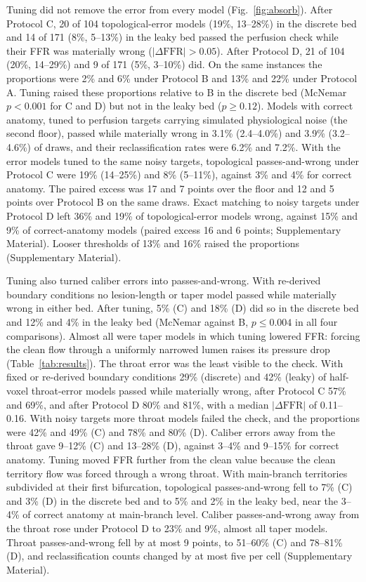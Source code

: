 \documentclass[journal,twoside,web]{ieeecolor}
\begin{document}
Tuning did not remove the error from every model (Fig.~\ref{fig:absorb}). After Protocol C, 20 of 104 topological-error models (19\%, 13--28\%) in the discrete bed and 14 of 171 (8\%, 5--13\%) in the leaky bed passed the perfusion check while their FFR was materially wrong ($|\Delta\mathrm{FFR}| > 0.05$). After Protocol D, 21 of 104 (20\%, 14--29\%) and 9 of 171 (5\%, 3--10\%) did. On the same instances the proportions were 2\% and 6\% under Protocol B and
13\% and 22\% under Protocol A. Tuning raised these proportions relative to B in the discrete bed (McNemar $p < 0.001$ for C and D)
but not in the leaky bed ($p \geq 0.12$). Models with
correct anatomy, tuned to perfusion targets carrying simulated physiological noise (the second floor), passed while materially wrong in 3.1\% (2.4--4.0\%) and 3.9\% (3.2--4.6\%) of draws, and their reclassification rates were 6.2\% and 7.2\%. With the error models tuned to the same noisy targets, topological passes-and-wrong under Protocol C were 19\% (14--25\%) and 8\% (5--11\%), against 3\% and 4\% for correct anatomy. The paired excess was 17 and 7 points over the floor and 12 and 5 points over Protocol B on the same draws. Exact matching to noisy targets under Protocol D left 36\% and 19\% of topological-error models wrong, against 15\% and 9\% of correct-anatomy models (paired excess 16 and 6 points; Supplementary Material).
Looser thresholds of 13\% and 16\% raised the proportions (Supplementary Material).

Tuning also turned caliber errors into passes-and-wrong. With re-derived boundary conditions no lesion-length or taper model
passed while materially wrong in either bed. After tuning, 5\% (C) and 18\% (D) did so in the discrete bed and 12\%
and 4\% in the leaky bed (McNemar against B, $p \leq 0.004$ in all four comparisons). Almost all were taper models
in which tuning lowered FFR: forcing the clean flow through a uniformly narrowed lumen raises its pressure drop
(Table~\ref{tab:results}). The throat error was the least visible to the check. With fixed or re-derived boundary conditions 29\% (discrete) and 42\% (leaky) of half-voxel throat-error models passed while materially wrong, after Protocol C 57\% and 69\%, and after Protocol D 80\% and 81\%, with a median $|\Delta\mathrm{FFR}|$ of 0.11--0.16. With noisy targets more throat models failed the check, and the proportions were 42\% and 49\% (C) and 78\% and 80\% (D). Caliber errors away from the throat gave 9--12\% (C) and 13--28\% (D), against 3--4\% and 9--15\% for correct anatomy. Tuning moved FFR further from the clean value because the clean territory flow was forced through a wrong throat.
With main-branch territories subdivided at their first bifurcation, topological passes-and-wrong fell to 7\% (C) and 3\% (D) in the discrete bed and to 5\% and 2\% in the leaky bed, near the 3--4\% of correct anatomy at main-branch level. Caliber passes-and-wrong away from the throat rose under Protocol D to 23\% and 9\%, almost all taper models. Throat passes-and-wrong fell by at most 9 points, to 51--60\% (C) and 78--81\% (D), and reclassification counts changed by at most five per cell (Supplementary Material).
\end{document}
